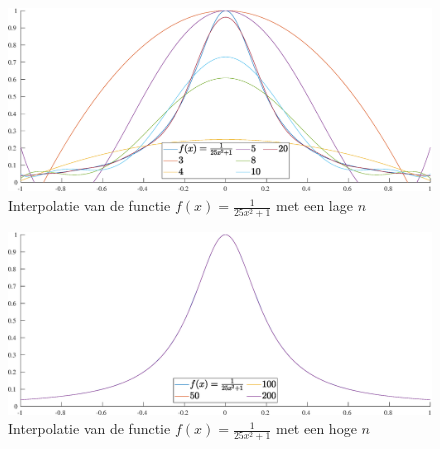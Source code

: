 \documentclass[a4paper, 12pt, titlepage, fleqn]{article}
\begin{document}
\begin{figure}
\centering
\includegraphics[scale=0.4]{../Afbeeldingen/runge_nul_laag.eps}
\caption{Interpolatie van de functie $f(x) = \frac{1}{25x^2+1}$ met een lage $n$}
\label{fig:lageNRungeNul}
\end{figure}

\begin{figure}
\centering
\includegraphics[scale=0.4]{../Afbeeldingen/runge_nul_hoog.eps}
\caption{Interpolatie van de functie $f(x) = \frac{1}{25x^2+1}$ met een hoge $n$}
\label{fig:hogeNRungeNul}
\end{figure}

\newpage
\end{document}
